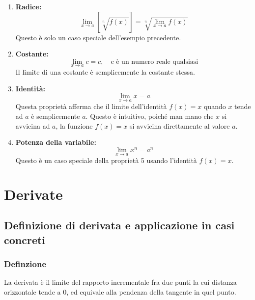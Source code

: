 \documentclass{article}
\begin{document}
\begin{enumerate}
    \item \textbf{Radice:}
    \begin{equation*}
        \lim_{x \to a} \left[ \sqrt[n]{f(x)} \right] = \sqrt[n]{\lim_{x \to a} f(x)}
    \end{equation*}
    Questo è solo un caso speciale dell'esempio precedente.
    
    \item \textbf{Costante:}
    \begin{equation*}
        \lim_{x \to a} c = c, \quad \text{c è un numero reale qualsiasi}
    \end{equation*}
    Il limite di una costante è semplicemente la costante stessa.
    
    \item \textbf{Identità:}
    \begin{equation*}
        \lim_{x \to a} x = a
    \end{equation*}
    Questa proprietà afferma che il limite dell'identità \(f(x) = x\) quando \(x\)
    tende ad \(a\) è semplicemente \(a\). Questo è intuitivo, poiché man mano che \(x\) si
    avvicina ad \(a\), la funzione \(f(x) = x\) si avvicina direttamente al valore \(a\).
    
    \item \textbf{Potenza della variabile:}
    \begin{equation*}
        \lim_{x \to a} x^n = a^n
    \end{equation*}
    Questo è un caso speciale della proprietà 5 usando l'identità \(f(x) = x\).
\end{enumerate}

\newpage
\section{Derivate}
\subsection{Definizione di derivata e applicazione in casi concreti}

\subsubsection{Definzione}
La derivata è il limite del rapporto incrementale fra due punti la cui distanza orizzontale
tende a 0, ed equivale alla pendenza della tangente in quel punto.
\end{document}
